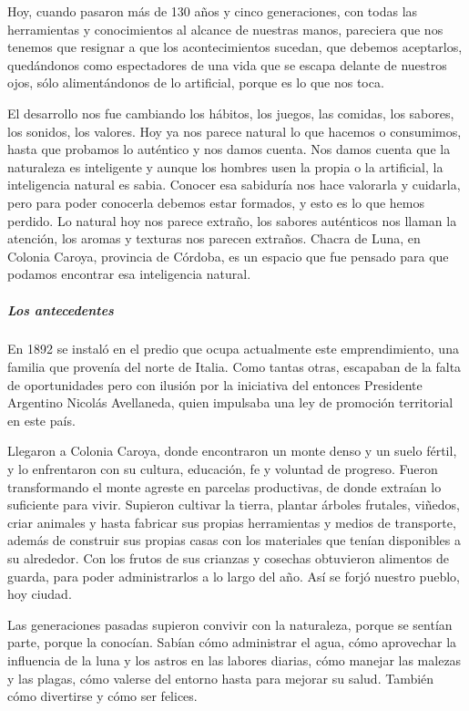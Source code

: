 \documentclass[
]{article}
\begin{document}
Hoy, cuando pasaron más de 130 años y cinco generaciones, con todas las
herramientas y conocimientos al alcance de nuestras manos, pareciera que
nos tenemos que resignar a que los acontecimientos sucedan, que debemos
aceptarlos, quedándonos como espectadores de una vida que se escapa
delante de nuestros ojos, sólo alimentándonos de lo artificial, porque
es lo que nos toca.

El desarrollo nos fue cambiando los hábitos, los juegos, las comidas,
los sabores, los sonidos, los valores. Hoy ya nos parece natural lo que
hacemos o consumimos, hasta que probamos lo auténtico y nos damos
cuenta. Nos damos cuenta que la naturaleza es inteligente y aunque los
hombres usen la propia o la artificial, la inteligencia natural es
sabia. Conocer esa sabiduría nos hace valorarla y cuidarla, pero para
poder conocerla debemos estar formados, y esto es lo que hemos perdido.
Lo natural hoy nos parece extraño, los sabores auténticos nos llaman la
atención, los aromas y texturas nos parecen extraños. Chacra de Luna, en
Colonia Caroya, provincia de Córdoba, es un espacio que fue pensado para
que podamos encontrar esa inteligencia natural.

\hypertarget{los-antecedentes}{%
\subparagraph{Los antecedentes}\label{los-antecedentes}}

En 1892 se instaló en el predio que ocupa actualmente este
emprendimiento, una familia que provenía del norte de Italia. Como
tantas otras, escapaban de la falta de oportunidades pero con ilusión
por la iniciativa del entonces Presidente Argentino Nicolás Avellaneda,
quien impulsaba una ley de promoción territorial en este país.

Llegaron a Colonia Caroya, donde encontraron un monte denso y un suelo
fértil, y lo enfrentaron con su cultura, educación, fe y voluntad de
progreso. Fueron transformando el monte agreste en parcelas productivas,
de donde extraían lo suficiente para vivir. Supieron cultivar la tierra,
plantar árboles frutales, viñedos, criar animales y hasta fabricar sus
propias herramientas y medios de transporte, además de construir sus
propias casas con los materiales que tenían disponibles a su alrededor.
Con los frutos de sus crianzas y cosechas obtuvieron alimentos de
guarda, para poder administrarlos a lo largo del año. Así se forjó
nuestro pueblo, hoy ciudad.

Las generaciones pasadas supieron convivir con la naturaleza, porque se
sentían parte, porque la conocían. Sabían cómo administrar el agua, cómo
aprovechar la influencia de la luna y los astros en las labores diarias,
cómo manejar las malezas y las plagas, cómo valerse del entorno hasta
para mejorar su salud. También cómo divertirse y cómo ser felices.
\end{document}
